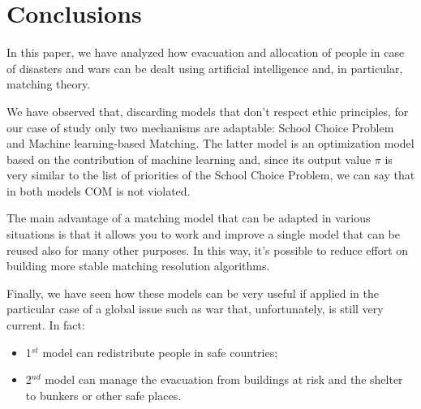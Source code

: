 \section{Conclusions}
In this paper, we have analyzed how evacuation and allocation of people in case of disasters and wars can be dealt using artificial intelligence and, in particular, matching theory.

We have observed that, discarding models that don’t respect ethic principles, for our case of study only two mechanisms are adaptable: School Choice Problem and Machine learning-based Matching. The latter model is an optimization model based on the contribution of machine learning and, since its output value \(\pi\) is very similar to the list of priorities of the School Choice Problem, we can say that in both models COM is not violated.

The main advantage of a matching model that can be adapted in various situations is that it allows you to work and improve a single model that can be reused also for many other purposes. In this way, it’s possible to reduce effort on building more stable matching resolution algorithms.

Finally, we have seen how these models can be very useful if applied in the particular case of a global issue such as war that, unfortunately, is still very current. In fact:
\begin{itemize}
    \item 1\(^{st}\) model can redistribute people in safe countries;
    \item 2\(^{nd}\) model can manage the evacuation from buildings at risk and the shelter to bunkers or other safe places.
\end{itemize}
